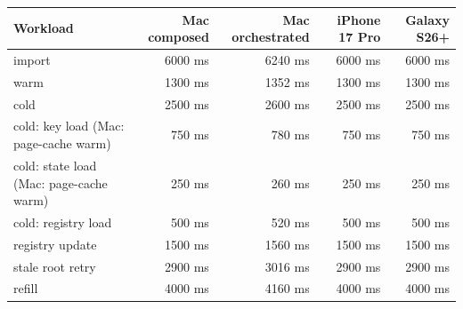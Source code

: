 \begin{tabular}{lrrrr}
\toprule
Workload & Mac composed & Mac orchestrated & iPhone 17 Pro & Galaxy S26+ \\
\midrule
import & 6000 ms & 6240 ms & 6000 ms & 6000 ms \\
warm & 1300 ms & 1352 ms & 1300 ms & 1300 ms \\
cold & 2500 ms & 2600 ms & 2500 ms & 2500 ms \\
cold: key load (Mac: page-cache warm) & 750 ms & 780 ms & 750 ms & 750 ms \\
cold: state load (Mac: page-cache warm) & 250 ms & 260 ms & 250 ms & 250 ms \\
cold: registry load & 500 ms & 520 ms & 500 ms & 500 ms \\
registry update & 1500 ms & 1560 ms & 1500 ms & 1500 ms \\
stale root retry & 2900 ms & 3016 ms & 2900 ms & 2900 ms \\
refill & 4000 ms & 4160 ms & 4000 ms & 4000 ms \\
\bottomrule
\end{tabular}
